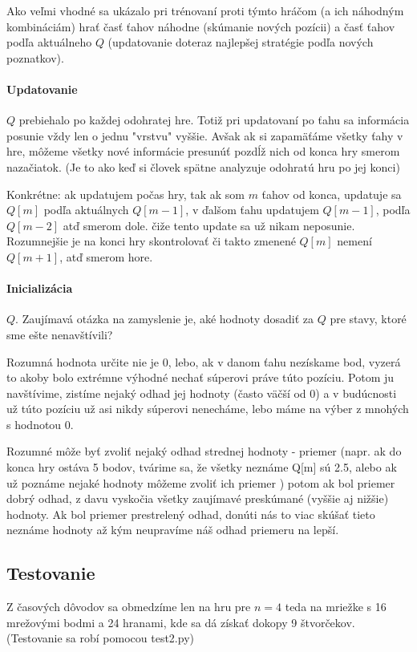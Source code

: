 \documentclass[10pt,a4paper]{article}
\begin{document}
Ako veľmi vhodné sa ukázalo pri trénovaní proti týmto hráčom (a ich náhodným kombináciám) hrať časť ťahov náhodne (skúmanie nových pozícii) 
a časť ťahov podľa aktuálneho $Q$ (updatovanie doteraz najlepšej stratégie podľa nových poznatkov).

\paragraph{Updatovanie} $Q$ prebiehalo po každej odohratej hre. Totiž pri updatovaní po ťahu sa informácia posunie vždy len o jednu "vrstvu" vyššie.
Avšak ak si zapamäťáme všetky ťahy v hre, môžeme všetky nové informácie presunúť pozdĺž nich od konca hry smerom nazačiatok.
(Je to ako keď si človek spätne analyzuje odohratú hru po jej konci)

Konkrétne: ak updatujem počas hry, tak ak som $m$ ťahov od konca, updatuje sa $Q[m]$ podľa aktuálnych $Q[m-1]$, v ďalšom ťahu updatujem $Q[m-1]$, podľa $Q[m-2]$ atď smerom dole. čiže tento update sa už nikam neposunie. Rozumnejšie je na konci hry skontrolovať či takto zmenené $Q[m]$ nemení $Q[m+1]$, atď smerom hore.

\paragraph{Inicializácia} $Q$. Zaujímavá otázka na zamyslenie je, aké hodnoty dosadiť za $Q$ pre stavy, ktoré sme ešte nenavštívili? 

Rozumná hodnota určite nie je 0, lebo, ak v danom ťahu nezískame bod, vyzerá to akoby bolo extrémne výhodné nechať súperovi práve túto pozíciu. 
Potom ju navštívime, zistíme nejaký odhad jej hodnoty (často väčší od 0) a v budúcnosti už túto pozíciu už asi nikdy súperovi nenecháme, lebo máme na výber z mnohých s hodnotou 0.

Rozumné môže byť zvoliť nejaký odhad strednej hodnoty - priemer (napr. ak do konca hry ostáva 5 bodov, tvárime sa, že všetky neznáme Q[m] sú 2.5, alebo ak už poznáme nejaké hodnoty môžeme zvoliť ich priemer	) potom ak bol priemer dobrý odhad, z davu vyskočia všetky zaujímavé preskúmané (vyššie aj nižšie) hodnoty.
Ak bol priemer prestrelený odhad, donúti nás to viac skúšať tieto neznáme hodnoty až kým neupravíme náš odhad priemeru na lepší.


\subsection{Testovanie}

Z časových dôvodov sa obmedzíme len na hru pre $n=4$ teda na mriežke s 16 mrežovými bodmi a 24 hranami, kde sa dá získať dokopy 9 štvorčekov.
(Testovanie sa robí pomocou test2.py)
\end{document}
